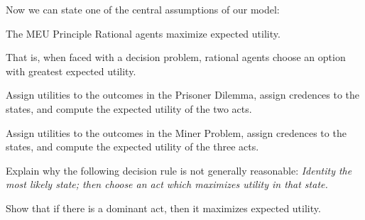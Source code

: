 Now we can state one of the central assumptions of our model:

\begin{genericthm}{The MEU Principle}
  Rational agents maximize expected utility. 
\end{genericthm}
%
That is, when faced with a decision problem, rational agents choose an
option with greatest expected utility.


\begin{exercise1}
  Assign utilities to the outcomes in the Prisoner Dilemma, assign
  credences to the states, and compute the expected utility of the two
  acts.
\end{exercise1}

\begin{exercise1}
  Assign utilities to the outcomes in the Miner Problem, assign
  credences to the states, and compute the expected utility of the
  three acts.
\end{exercise1}

\begin{exercise2}
  Explain why the following decision rule is not generally reasonable:
  \emph{Identity the most likely state; then choose an act which
    maximizes utility in that state.} 
\end{exercise2}

\begin{exercise3}
  Show that if there is a dominant act, then it maximizes
  expected utility.
\end{exercise3}


